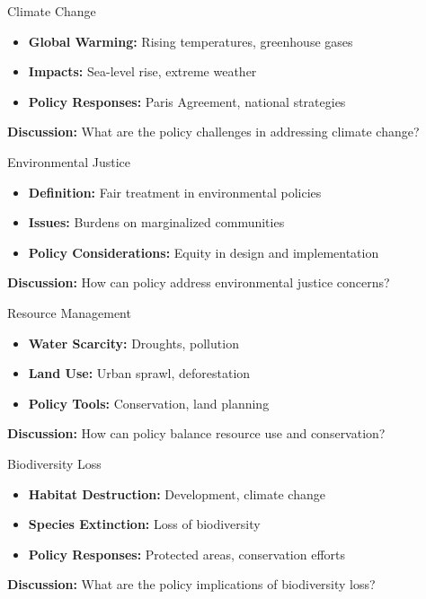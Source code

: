 \documentclass[11pt, aspectratio=169]{beamer}
\begin{document}
\begin{frame}{Climate Change}
    \begin{itemize}
        \item \textbf{Global Warming:} Rising temperatures, greenhouse gases
        \item \textbf{Impacts:} Sea-level rise, extreme weather
        \item \textbf{Policy Responses:} Paris Agreement, national strategies
    \end{itemize}
    \pause
    \textbf{Discussion:} What are the policy challenges in addressing climate change?
\end{frame}

\begin{frame}{Environmental Justice}
    \begin{itemize}
        \item \textbf{Definition:} Fair treatment in environmental policies
        \item \textbf{Issues:} Burdens on marginalized communities
        \item \textbf{Policy Considerations:} Equity in design and implementation
    \end{itemize}
    \pause
    \textbf{Discussion:} How can policy address environmental justice concerns?
\end{frame}

\begin{frame}{Resource Management}
    \begin{itemize}
        \item \textbf{Water Scarcity:} Droughts, pollution
        \item \textbf{Land Use:} Urban sprawl, deforestation
        \item \textbf{Policy Tools:} Conservation, land planning
    \end{itemize}
    \pause
    \textbf{Discussion:} How can policy balance resource use and conservation?
\end{frame}

\begin{frame}{Biodiversity Loss}
    \begin{itemize}
        \item \textbf{Habitat Destruction:} Development, climate change
        \item \textbf{Species Extinction:} Loss of biodiversity
        \item \textbf{Policy Responses:} Protected areas, conservation efforts
    \end{itemize}
    \pause
    \textbf{Discussion:} What are the policy implications of biodiversity loss?
\end{frame}
\end{document}
